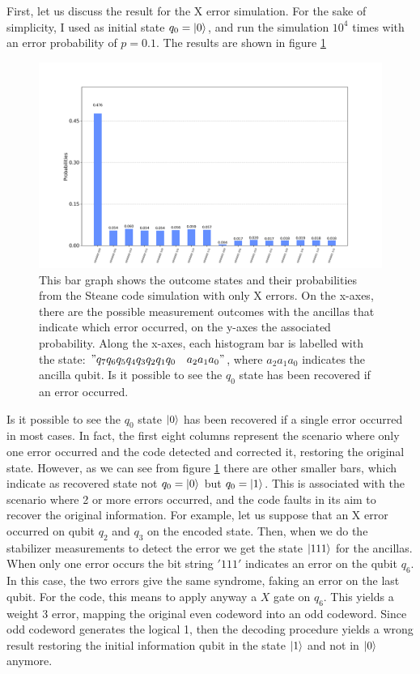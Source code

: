 First, let us discuss the result for the X error simulation. For the sake of simplicity, I used as initial state $q_0=\ket{0}$, and run the simulation $10^4$ times with an error probability of $p=0.1$.
The results are shown in figure \ref{fig:Xerror_Steane}
\begin{figure}[h!]
    \centering
    \includegraphics[width=\textwidth]{Mainmatter/images/7qubit_Xerrors.png}
    \caption{ This bar graph shows the outcome states and their probabilities from the Steane code simulation with only X errors. On the x-axes, there are the possible measurement outcomes with the ancillas that indicate which error occurred, on the y-axes the associated probability. Along the x-axes, each histogram bar is labelled with the state: $"q_7 q_6 q_5 q_4 q_3 q_2 q_1 q_0  \quad a_2a_1a_0"$, where $a_2a_1a_0$ indicates the ancilla qubit. Is it possible to see the $q_0$ state has been recovered if an error occurred.}
    \label{fig:Xerror_Steane}
\end{figure}

Is it possible to see the $q_0$ state $\ket{0}$ has been recovered if a single error occurred in most cases.  In fact, the first eight columns represent the scenario where only one error occurred and the code detected and corrected it, restoring the original state. 
However, as we can see from figure \ref{fig:Xerror_Steane} there are other smaller bars, which indicate as recovered state not $q_0=\ket{0}$ but $q_0=\ket{1}$. This is associated with the scenario where 2 or more errors occurred, and the code faults in its aim to recover the original information. For example, let us suppose that an X error occurred on qubit $q_2$ and $q_3$ on the encoded state. Then, when we do the stabilizer measurements to detect the error we get the state $\ket{111}$ for the ancillas. When only one error occurs the bit string $'111'$ indicates an error on the qubit $q_6$. In this case, the two errors give the same syndrome, faking an error on the last qubit. For the code, this means to apply anyway a $X$ gate on $q_6$.
This yields a weight 3 error, mapping the original even codeword into an odd codeword. Since odd codeword generates the logical 1, then the decoding procedure yields a wrong result restoring the initial information qubit in the state $\ket{1}$ and not in $\ket{0}$ anymore.




